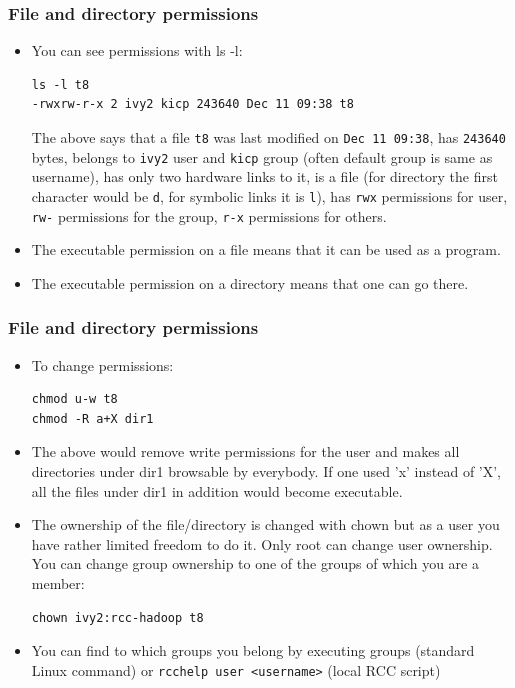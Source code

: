 \documentclass{beamer}
\begin{document}
\begin{frame}[fragile]
  \frametitle{File and directory permissions}
  \begin{itemize}
    \item You can see permissions with  {\color{mycolorcli}ls -l}:
{\color{mycolorcli}
\begin{verbatim}
ls -l t8
-rwxrw-r-x 2 ivy2 kicp 243640 Dec 11 09:38 t8
\end{verbatim}
}      
The above says that a file {\color{mycolorcli}\verb|t8|} was last modified on  {\color{mycolorcli}\verb|Dec 11 09:38|}, has  {\color{mycolorcli}\verb|243640|} bytes, belongs to  
{\color{mycolorcli}\verb|ivy2|} user and  {\color{mycolorcli}\verb|kicp|} group (often default group is same as username), 
has only two hardware links to it, is a file (for directory the first character would be  {\color{mycolorcli}\verb|d|}, for symbolic links it is    
{\color{mycolorcli}\verb|l|}), has  {\color{mycolorcli}\verb|rwx|} permissions for user,  {\color{mycolorcli}\verb|rw-|} permissions for the group,  {\color{mycolorcli}\verb|r-x|} permissions for others.
\item The executable permission on a file means that it can be used as a program.
\item The executable permission on a directory means that one can go there.
\end{itemize}
\end{frame}


\begin{frame}[fragile]
  \frametitle{File and directory permissions}
  \begin{itemize}
\item To change permissions:
{\color{mycolorcli}
\begin{verbatim}
chmod u-w t8
chmod -R a+X dir1
\end{verbatim}
}
\item The above would remove write permissions for the user and makes 
all directories under {\color{mycolorcli}dir1} browsable by everybody. If one used 'x' instead of 'X', all the files under {\color{mycolorcli}dir1} in addition would become executable. 
\item The ownership of the file/directory is changed with {\color{mycolorcli}chown} but as a user you have rather limited freedom to do it. Only root can change user ownership. You can change group ownership to one of the groups of which you are
  a member:
{\color{mycolorcli}
\begin{verbatim}
chown ivy2:rcc-hadoop t8
\end{verbatim}
}
\item You can find to which groups you belong by executing {\color{mycolorcli}groups} (standard Linux command) or {\color{mycolorcli}\verb|rcchelp user <username>|} (local RCC script)
\end{itemize}
\end{frame}
\end{document}
